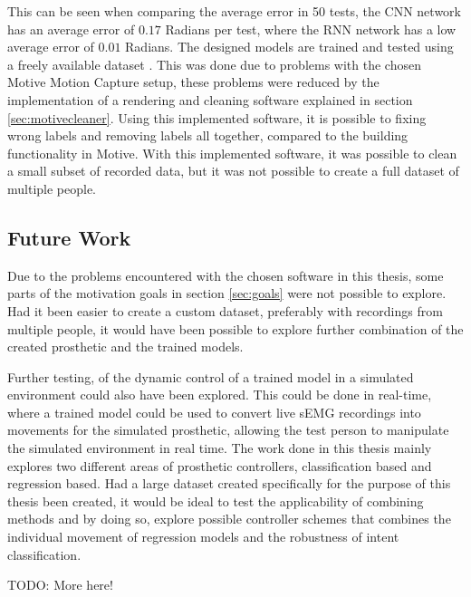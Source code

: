 \documentclass[../main.tex]{subfiles}
\begin{document}
This can be seen when comparing the average error in 50 tests, the CNN network has an average error of $0.17$ Radians per test, where the RNN network has a low average error of $0.01$ Radians.
The designed models are trained and tested using a freely available dataset \cite{kinmusdataset}.
This was done due to problems with the chosen Motive Motion Capture setup, these problems were reduced by the implementation of a rendering and cleaning software explained in section \ref{sec:motivecleaner}.
Using this implemented software, it is possible to fixing wrong labels and removing labels all together, compared to the building functionality in Motive.
With this implemented software, it was possible to clean a small subset of recorded data, but it was not possible to create a full dataset of multiple people.



\newpage
\subsection{Future Work}

Due to the problems encountered with the chosen software in this thesis, some parts of the motivation goals in section \ref{sec:goals} were not possible to explore.
Had it been easier to create a custom dataset, preferably with recordings from multiple people, it would have been possible to explore further combination of the created prosthetic and the trained models.

Further testing, of the dynamic control of a trained model in a simulated environment could also have been explored.
This could be done in real-time, where a trained model could be used to convert live sEMG recordings into movements for the simulated prosthetic, allowing the test person to manipulate the simulated environment in real time.
The work done in this thesis mainly explores two different areas of prosthetic controllers, classification based and regression based.
Had a large dataset created specifically for the purpose of this thesis been created, it would be ideal to test the applicability of combining methods and by doing so, explore possible controller schemes that combines the individual movement of regression models and the robustness of intent classification.  


TODO: More here!
\end{document}
